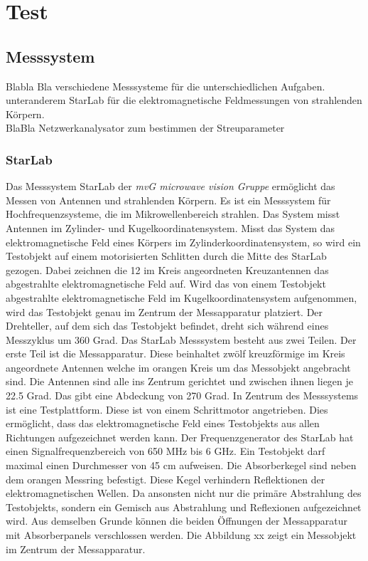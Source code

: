 \section{Test}
\subsection{Messsystem}
Blabla Bla verschiedene Messsysteme für die unterschiedlichen Aufgaben.\\
unteranderem  StarLab für die elektromagnetische Feldmessungen von strahlenden Körpern.\\

BlaBla Netzwerkanalysator zum bestimmen der Streuparameter
\subsubsection{StarLab}
Das Messsystem  StarLab der \textit{mvG microwave vision Gruppe} ermöglicht das Messen von Antennen und strahlenden Körpern. Es ist ein Messsystem für Hochfrequenzsysteme, die im Mikrowellenbereich strahlen. Das System misst Antennen im Zylinder- und Kugelkoordinatensystem. Misst das System das elektromagnetische Feld eines Körpers im Zylinderkoordinatensystem, so wird ein Testobjekt auf einem motorisierten Schlitten durch die Mitte des StarLab gezogen. Dabei zeichnen die 12 im Kreis angeordneten Kreuzantennen das abgestrahlte elektromagnetische Feld auf. 
Wird das von einem Testobjekt abgestrahlte elektromagnetische Feld im Kugelkoordinatensystem aufgenommen, wird das Testobjekt genau im Zentrum der Messapparatur platziert. Der Drehteller, auf dem sich das Testobjekt befindet, dreht sich während eines Messzyklus um 360 Grad. 
Das StarLab Messsystem besteht aus  zwei Teilen. Der erste Teil ist die Messapparatur. Diese beinhaltet zwölf kreuzförmige im Kreis angeordnete Antennen welche im orangen Kreis um das Messobjekt angebracht sind.  Die Antennen sind alle ins Zentrum gerichtet und zwischen ihnen liegen je 22.5 Grad. Das gibt eine Abdeckung von 270 Grad. In Zentrum des Messsystems ist eine Testplattform. Diese ist von einem Schrittmotor angetrieben. Dies ermöglicht, dass das elektromagnetische Feld eines Testobjekts aus allen Richtungen aufgezeichnet werden kann. Der Frequenzgenerator des StarLab hat einen Signalfrequenzbereich von 650 MHz bis 6 GHz. Ein Testobjekt darf maximal einen Durchmesser von 45 cm aufweisen.
Die Absorberkegel sind neben dem orangen Messring befestigt. Diese Kegel verhindern Reflektionen der elektromagnetischen Wellen. Da ansonsten nicht nur die primäre Abstrahlung des Testobjekts, sondern ein Gemisch aus Abstrahlung und Reflexionen aufgezeichnet wird. Aus demselben Grunde können die beiden Öffnungen der Messapparatur mit Absorberpanels verschlossen werden. Die Abbildung xx zeigt ein Messobjekt im Zentrum der Messapparatur. 

